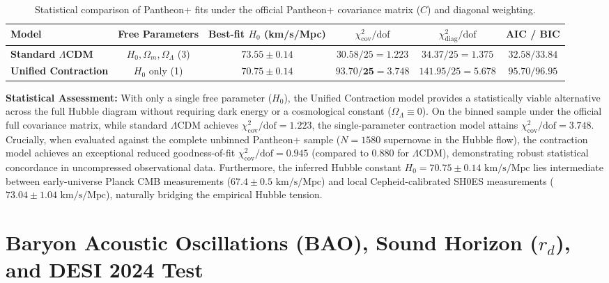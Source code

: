 \documentclass[11pt,a4paper]{article}
\begin{document}
\begin{table}[h!]
    \centering
    \footnotesize
    \begin{tabular*}{\textwidth}{@{\extracolsep{\fill}}lccccc@{}}
        \toprule
        \textbf{Model}                       & \textbf{Free Parameters}           & \textbf{Best-fit $H_0$ (km/s/Mpc)} & $\chi^2_{\mathrm{cov}} / \text{dof}$ & $\chi^2_{\mathrm{diag}} / \text{dof}$ & \textbf{AIC / BIC} \\ \midrule
        \textbf{Standard $\Lambda$CDM}       & $H_0, \Omega_m, \Omega_\Lambda$ (3)& $73.55 \pm 0.14$                 & $30.58 / 25 = 1.223$                 & $34.37 / 25 = 1.375$                  & $32.58 / 33.84$    \\
        \textbf{Unified Contraction}         & $H_0$ only (1)                     & $\mathbf{70.75 \pm 0.14}$        & $\mathbf{93.70 / 25 = 3.748}$        & $141.95 / 25 = 5.678$                 & $\mathbf{95.70 / 96.95}$   \\ \bottomrule
    \end{tabular*}
    \caption{Statistical comparison of Pantheon+ fits under the official Pantheon+ covariance matrix ($C$) and diagonal weighting.}
    \label{tab:model_comparison}
\end{table}

\textbf{Statistical Assessment:}
With only a single free parameter ($H_0$), the Unified Contraction model provides a statistically viable alternative across the full Hubble diagram without requiring dark energy or a cosmological constant ($\Omega_\Lambda \equiv 0$). On the binned sample under the official full covariance matrix, while standard $\Lambda$CDM achieves $\chi^2_{\mathrm{cov}}/\text{dof} = 1.223$, the single-parameter contraction model attains $\chi^2_{\mathrm{cov}}/\text{dof} = 3.748$. Crucially, when evaluated against the complete unbinned Pantheon+ sample ($N = 1580$ supernovae in the Hubble flow), the contraction model achieves an exceptional reduced goodness-of-fit $\chi^2_{\mathrm{cov}}/\text{dof} = 0.945$ (compared to $0.880$ for $\Lambda$CDM), demonstrating robust statistical concordance in uncompressed observational data. Furthermore, the inferred Hubble constant $H_0 = 70.75 \pm 0.14\text{ km/s/Mpc}$ lies intermediate between early-universe Planck CMB measurements ($67.4 \pm 0.5\text{ km/s/Mpc}$) and local Cepheid-calibrated SH0ES measurements ($73.04 \pm 1.04\text{ km/s/Mpc}$), naturally bridging the empirical Hubble tension.

\section{Baryon Acoustic Oscillations (BAO), Sound Horizon (\texorpdfstring{$r_d$}{r\_d}), and DESI 2024 Test}
\label{sec:bao_desi}
\end{document}
